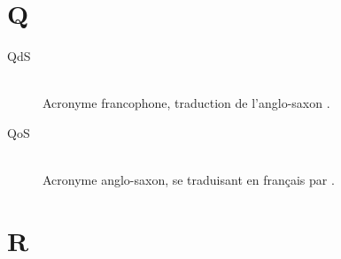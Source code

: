 \section*{Q}

\begin{description}

\item[QdS]  \\
Acronyme francophone, traduction de l'anglo-saxon .

\item[QoS]  \\
Acronyme anglo-saxon, se traduisant en français par .

\end{description}


\section*{R}

